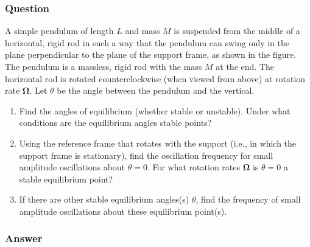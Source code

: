 \subsubsection{Question}
A simple pendulum of length $L$ and mass $M$ is suspended from the middle of a horizontal, rigid rod in such a way that the pendulum can swing only in the plane perpendicular to the plane of the support frame, as shown in the figure. The pendulum is a massless, rigid rod with the mass $M$ at the end. The horizontal rod is rotated counterclockwise (when viewed from above) at rotation rate $\boldsymbol{\Omega}$. Let $\theta$ be the angle between the pendulum and the vertical.
\begin{enumerate}
	\item Find the angles of equilibrium (whether stable or unstable). Under what conditions are the equilibrium angles stable points?
	\item Using the reference frame that rotates with the support (i.e., in which the support frame is stationary), find the oscillation frequency for small amplitude oscillations about $\theta=0$. For what rotation rates $\boldsymbol{\Omega}$ is $\theta=0$ a stable equilibrium point?
	\item If there are other stable equilibrium angles(s) $\theta$, find the frequency of small amplitude oscillations about these equilibrium point(s).
\end{enumerate}
\subsubsection{Answer}


